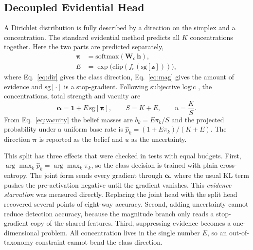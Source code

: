 \documentclass[conference]{IEEEtran}
\newcommand{\bs}[1]{\boldsymbol{#1}}
\newcommand{\sub}[1]{\subsection{\texorpdfstring{\textbf{#1}}{#1}}}
\begin{document}
\sub{Decoupled Evidential Head}
A Dirichlet distribution is fully described by a direction on the simplex and a
concentration. The standard evidential method \cite{sensoy2018edl} predicts all $K$
concentrations together. Here the two parts are predicted separately,
\begin{align}
\bs{\pi} &= \mathrm{softmax}(\bs{W}_{c}\,\bs{h}), \label{eq:dir}\\
E &= \exp\bigl(\mathrm{clip}(f_{e}(\mathrm{sg}[\bs{z}]))\bigr), \label{eq:mag}
\end{align}
where Eq.~\eqref{eq:dir} gives the class direction, Eq.~\eqref{eq:mag} gives the
amount of evidence and $\mathrm{sg}[\cdot]$ is a stop-gradient. Following subjective
logic \cite{josang2016subjective}, the concentrations, total strength and vacuity are
\begin{equation}
\bs{\alpha} = \bs{1} + E\,\mathrm{sg}[\bs{\pi}], \qquad S = K + E, \qquad
u = \frac{K}{S}.
\label{eq:vacuity}
\end{equation}
From Eq.~\eqref{eq:vacuity} the belief masses are $b_{k}=E\pi_{k}/S$ and the projected
probability under a uniform base rate is $\hat{p}_{k}=(1+E\pi_{k})/(K+E)$. The
direction $\bs{\pi}$ is reported as the belief and $u$ as the uncertainty.

This split has three effects that were checked in tests with equal budgets. First,
$\arg\max_{k}\hat{p}_{k}=\arg\max_{k}\pi_{k}$, so the class decision is trained with
plain cross-entropy. The joint form sends every gradient through $\bs{\alpha}$, where
the usual KL term pushes the pre-activation negative until the gradient vanishes.
This \emph{evidence starvation} was measured directly. Replacing the joint head with
the split head recovered several points of eight-way accuracy. Second, adding
uncertainty cannot reduce detection accuracy, because the magnitude branch only reads
a stop-gradient copy of the shared features. Third, suppressing evidence becomes a
one-dimensional problem. All concentration lives in the single number $E$, so an
out-of-taxonomy constraint cannot bend the class direction.
\end{document}
